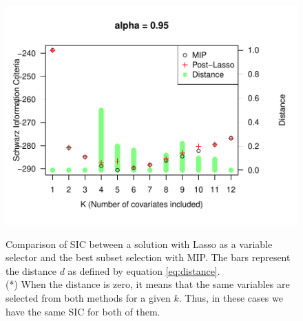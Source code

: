 \begin{figure}
\begin{minipage}[t]{0.4\linewidth}
\begin{minipage}[b]{\linewidth}
			\centering     \includegraphics[width=\textwidth]{Figuras/SIC095.pdf}
			\label{fig:npqar-cross}
		\end{minipage}
	\end{minipage}
	\caption{Comparison of SIC between a solution with Lasso as a variable selector and the best subset selection with MIP. The bars represent the distance $d$ as defined by equation \ref{eq:distance}. \\ (*) When the distance is zero, it means that the same variables are selected from both methods for a given $k$. Thus, in these cases we have the same SIC for both of them.}
	\label{fig:comparison-lm-results}
\end{figure}

